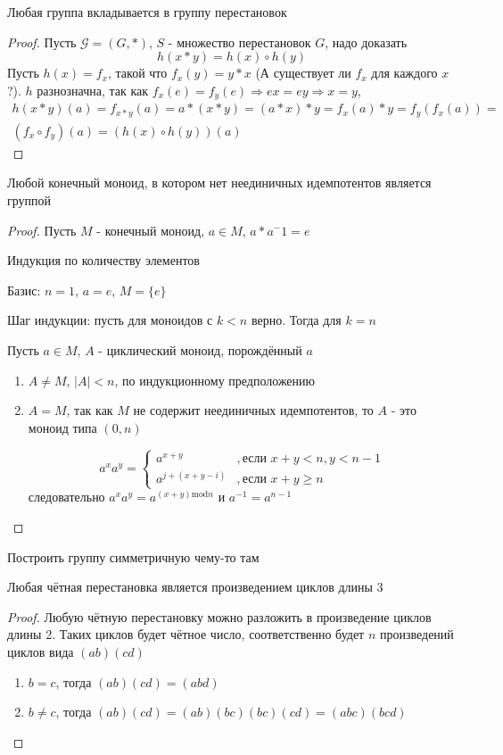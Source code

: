 \documentclass[../main/document.tex]{subfiles}
\begin{document}
\begin{thm}
Любая группа вкладывается в группу перестановок
\begin{proof}
Пусть $\mathcal{G}=(G,*)$, $S$ - множество перестановок $G$, надо доказать
$$h(x*y)=h(x)\circ h(y)$$
Пусть $h(x)=f_x$, такой что $f_x(y)=y*x$ (А существует ли $f_x$ для каждого $x$?). $h$ разнозначна, так как $f_x(e)=f_y(e)\Rightarrow ex=ey\Rightarrow x=y$,
\begin{multline*}
h(x*y)(a)=f_{x*y}(a)=a*(x*y)=(a*x)*y=f_x(a)*y=f_y(f_x(a))=\\
(f_x\circ f_y)(a)=(h(x)\circ h(y))(a)
\end{multline*}
\end{proof}
\end{thm}
\begin{thm}
Любой конечный моноид, в котором нет неединичных идемпотентов является группой
\begin{proof}
Пусть $M$ - конечный моноид, $a\in M$, $a*a^-1=e$

Индукция по количеству элементов

Базис: $n=1$, $a=e$, $M=\{e\}$

Шаг индукции: пусть для моноидов с $k<n$ верно. Тогда для $k=n$

Пусть $a\in M$, $A$ - циклический моноид, порождённый $a$
\begin{enumerate}
\item $A\neq M$, $|A|<n$, по индукционному предположению
\item $A=M$, так как $M$ не содержит неединичных идемпотентов, то $A$ - это моноид типа $(0,n)$ 

$$a^xa^y=\begin{cases} a^{x+y} &,\mbox{если } x+y<n, y<n-1\\
a^{j+(x+y-i)}&,\mbox{если } x+y\geq n\end{cases}$$
следовательно $a^xa^y=a^{(x+y)\mathrm{mod}n}$ и $a^{-1}=a^{n-1}$

\end{enumerate}
\end{proof}
\end{thm}

\begin{exm}
Построить группу симметричную чему-то там
\end{exm}

\begin{thm}
Любая чётная перестановка является произведением циклов длины 3

\begin{proof}
Любую чётную перестановку  можно разложить в произведение циклов длины 2. Таких циклов будет чётное число, соответственно будет $n$ произведений циклов вида $(ab)(cd)$
\begin{enumerate}
\item $b=c$, тогда $(ab)(cd)=(abd)$
\item $b\neq c$, тогда $(ab)(cd)=(ab)(bc)(bc)(cd)=(abc)(bcd)$
\end{enumerate}
\end{proof}
\end{thm}
\end{document}
